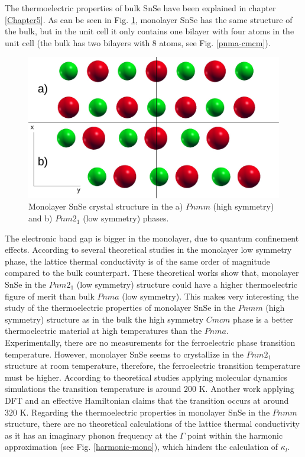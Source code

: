 The thermoelectric properties of bulk SnSe have been explained in chapter \ref{Chapter5}. As can be seen in 
Fig. \ref{pnma-cmcm-mono}, monolayer SnSe has the same structure of the bulk, but in the unit cell 
it only contains one bilayer with four atoms in the unit cell (the bulk has two bilayers with 8 atoms, see 
Fig. \ref{pnma-cmcm}). 
\begin{figure}[h]
\begin{center}
\includegraphics[width=0.8\linewidth]{Figures/monolayer-structure.pdf}
	\caption[Monolayer SnSe crystal structure]{Monolayer SnSe crystal structure in the a) $Pnmm$ (high symmetry) 
	and b) $Pnm2_{1}$ (low symmetry) phases.}
\label{pnma-cmcm-mono}
\end{center}
\end{figure}
The electronic band gap is bigger in the monolayer\cite{wang2015thermoelectric,hu2017high}, due to quantum 
confinement effects. According to several theoretical studies\cite{wang2015thermoelectric,hu2017high} in the 
monolayer low symmetry phase, the lattice thermal conductivity is of the same order of magnitude compared to the 
bulk counterpart. These theoretical works show that, monolayer SnSe in the $Pnm2_{1}$ (low symmetry) structure could 
have a higher thermoelectric figure of merit\cite{wang2015thermoelectric,hu2017high} than bulk $Pnma$ (low symmetry). This makes very interesting the study of the thermoelectric properties of monolayer SnSe in the $Pnmm$ (high 
symmetry) structure as in the bulk the high symmetry $Cmcm$ phase is a better thermoelectric material at high 
temperatures than the $Pnma$. \\

Experimentally, there are no measurements for the ferroelectric phase transition temperature. However, monolayer 
SnSe seems to crystallize in the $Pnm2_{1}$ structure at room temperature\cite{li2013single,chang2020controlled}, 
therefore, the ferroelectric transition temperature must be higher. According to theoretical studies applying 
molecular dynamics simulations\cite{mehboudi2016structural,barraza2018tuning} the transition temperature is around 
$200$ K. Another work applying DFT and an effective Hamiltonian claims\cite{fei2016ferroelectricity} that the 
transition occurs at around $320$ K. Regarding the thermoelectric properties in monolayer SnSe in the $Pnmm$ 
structure, there are no theoretical calculations of the lattice thermal conductivity as it has an imaginary phonon 
frequency at the $\Gamma$ point within the harmonic approximation (see Fig. \ref{harmonic-mono}), which hinders the 
calculation of $\kappa_{l}$. \\

